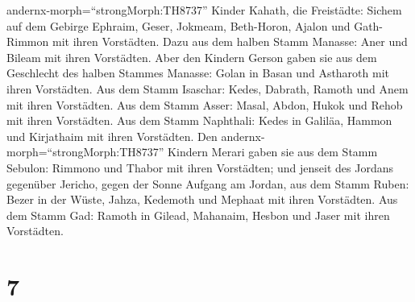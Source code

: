 andernx-morph=``strongMorph:TH8737'' Kinder Kahath, die Freistädte:
Sichem auf dem Gebirge Ephraim, Geser,  Jokmeam,
Beth-Horon,  Ajalon und Gath-Rimmon mit ihren Vorstädten.
 Dazu aus dem halben Stamm Manasse: Aner und Bileam mit
ihren Vorstädten.  Aber den Kindern Gerson gaben sie aus
dem Geschlecht des halben Stammes Manasse: Golan in Basan und Astharoth
mit ihren Vorstädten.  Aus dem Stamm Isaschar: Kedes,
Dabrath,  Ramoth und Anem mit ihren Vorstädten.
 Aus dem Stamm Asser: Masal, Abdon,  Hukok und
Rehob mit ihren Vorstädten.  Aus dem Stamm Naphthali: Kedes
in Galiläa, Hammon und Kirjathaim mit ihren Vorstädten. 
Den andernx-morph=``strongMorph:TH8737'' Kindern Merari gaben sie aus
dem Stamm Sebulon: Rimmono und Thabor mit ihren Vorstädten;
 und jenseit des Jordans gegenüber Jericho, gegen der Sonne
Aufgang am Jordan, aus dem Stamm Ruben: Bezer in der Wüste, Jahza,
 Kedemoth und Mephaat mit ihren Vorstädten. 
Aus dem Stamm Gad: Ramoth in Gilead, Mahanaim,  Hesbon und
Jaser mit ihren Vorstädten.

\hypertarget{section-6}{%
\section{7}\label{section-6}}


